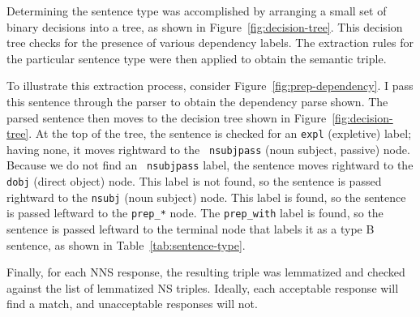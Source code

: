 Determining the sentence type was accomplished by arranging a small set of binary decisions into a tree, as shown in Figure~\ref{fig:decision-tree}. This decision tree checks for the presence of various dependency labels. The extraction rules for the particular sentence type were then applied to obtain the semantic triple. 

To illustrate this extraction process, consider Figure~\ref{fig:prep-dependency}.  I pass this
sentence through the parser to obtain the dependency parse shown. The parsed sentence then moves to the decision tree shown in Figure~\ref{fig:decision-tree}.
At the top of the tree, the sentence is checked for an {\tt expl}
(expletive) label; having none, it moves rightward to the {\tt
  nsubjpass} (noun subject, passive) node. Because we do not find an {\tt
  nsubjpass} label, the sentence moves rightward to the {\tt dobj} (direct object)
node. This label is not found, so the sentence is passed rightward to the {\tt nsubj} (noun subject) node. This label is found, so the sentence is passed leftward to the {\tt prep\_\**} node. The {\tt prep\_with} label is found, so the sentence is passed leftward to the terminal node that labels it as a type B sentence, as shown in Table~\ref{tab:sentence-type}.

Finally, for each NNS response, the resulting triple was lemmatized and checked against the list of lemmatized NS triples. Ideally, each acceptable response will find a match, and unacceptable responses will not.

